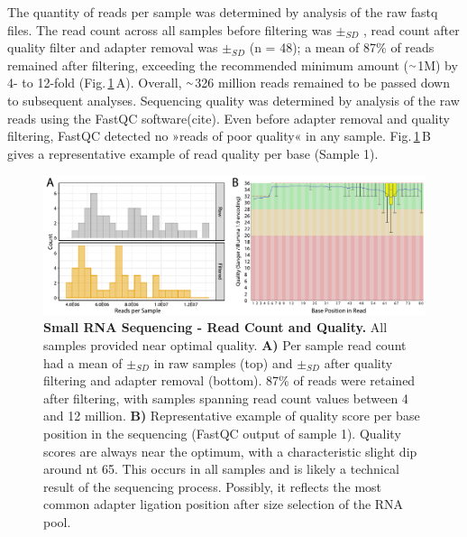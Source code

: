 \begin{method}
The quantity of reads per sample was determined by analysis of the raw fastq files. The read count across all samples before filtering was  $\pm_{SD}$ , read count after quality filter and adapter removal was  $\pm_{SD}$  (n = 48); a mean of 87\% of reads remained after filtering, exceeding the recommended minimum amount ($\smallsim$\num{1}M) by 4- to 12-fold (Fig.\,\ref{fig:read-quality}\,A). Overall, $\smallsim$326 million reads remained to be passed down to subsequent analyses. Sequencing quality was determined by analysis of the raw reads using the FastQC software(cite). Even before adapter removal and quality filtering, FastQC detected no »reads of poor quality« in any sample. Fig.\,\ref{fig:read-quality}\,B gives a representative example of read quality per base (Sample \num{1}).

\end{method}

\begin{figure}
\centering
\includegraphics[width=\textwidth]{figures/read-quality}
\caption[Small RNA Sequencing - Read Count and Quality.]{\textbf{Small RNA Sequencing - Read Count and Quality.} All samples provided near optimal quality. \textbf{A)} Per sample read count had a mean of  $\pm_{SD}$  in raw samples (top) and  $\pm_{SD}$  after quality filtering and adapter removal (bottom). 87\% of reads were retained after filtering, with samples spanning read count values between 4 and 12 million. \textbf{B)} Representative example of quality score per base position in the sequencing (FastQC output of sample \num{1}). Quality scores are always near the optimum, with a characteristic slight dip around nt 65. This occurs in all samples and is likely a technical result of the sequencing process. Possibly, it reflects the most common adapter ligation position after size selection of the RNA pool.
\label{fig:read-quality}}
\end{figure}

